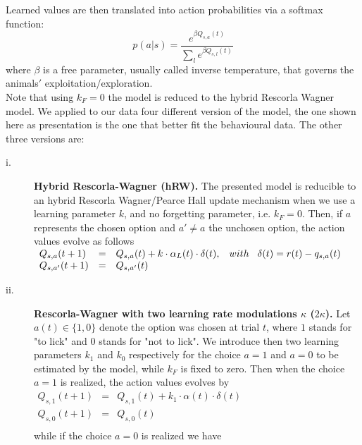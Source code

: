 Learned values are then translated into action probabilities via a softmax function:
\begin{equation}
p(a|s)=\frac{e^{\beta Q_{s,a}(t)}}{\sum_l e^{\beta Q_{s,l}(t)}}
\label{eq:ProbMod}
\end{equation}
where $\beta$ is a free parameter, usually called inverse temperature, that governs the animals$'$ exploitation/exploration.\\
Note that using $k_F = 0$ the model is reduced to the hybrid Rescorla Wagner model. We applied to our data four different version of the model, the one shown here as presentation is the one that better fit the behavioural data. The other three versions are:
\begin{description}
    \item[i.] \textbf{Hybrid Rescorla-Wagner (hRW).} The presented model is reducible to an hybrid Rescorla Wagner/Pearce Hall update mechanism when we use a learning parameter $k$, and no forgetting parameter, i.e. $k_F = 0$.
    Then, if $a$ represents the chosen option and $a'\neq a$ the unchosen option, the action values evolve as follows\\
    $\begin{array}{lcl}
    Q_{s,a}(t+1)&=& Q_{s,a}(t)+k\cdot\alpha_L(t)\cdot\delta(t), \hspace{0.3cm} with \hspace{0.3cm}\delta(t)=r(t)-q_{s,a}(t)\\
    Q_{s,a'}(t+1)&=&Q_{s,a'}(t)\\
    \end{array}$
    \item[ii.] \textbf{Rescorla-Wagner with two learning rate modulations $\kappa$ ($2\kappa$).} Let $a(t) \in \{1,0\}$ denote the option was chosen at trial $t$, where $1$ stands for "to lick" and $0$ stands for "not to lick". We introduce then two learning parameters $k_{1}$ and $k_{0}$ respectively for the choice $a=1$ and $a=0$ to be estimated by the model, while $k_F$ is fixed to zero.
    Then when the choice $a=1$ is realized, the action values evolves by\\
   $\begin{array}{lcl}
       Q_{s,1}(t+1)&=&Q_{s,1}(t)+k_1\cdot\alpha(t)\cdot\delta(t)\\
         Q_{s,0}(t+1)&=&Q_{s,0}(t)\\ 
    \end{array}$\\
    while if the choice $a=0$ is realized we have\\

\end{description}
